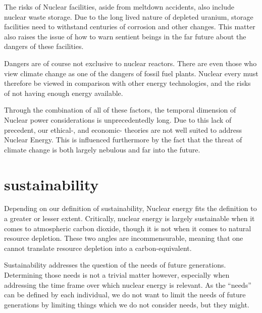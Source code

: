 \documentclass[12pt]{report}
\begin{document}
The risks of Nuclear facilities, aside from meltdown accidents, also include
nuclear waste storage. Due to the long lived nature of depleted uranium, storage
facilities need to withstand centuries of corrosion and other changes. This
matter also raises the issue of how to warn sentient beings in the far future
about the dangers of these facilities.

Dangers are of course not exclusive to nuclear reactors. There are even those
who view climate change as one of the dangers of fossil fuel plants. Nuclear
every must therefore be viewed in comparison with other energy technologies, and
the risks of not having enough energy available.

Through the combination of all of these factors, the temporal dimension of
Nuclear power considerations is unprecedentedly long. Due to this lack of
precedent, our ethical-, and economic- theories are not well suited to address
Nuclear Energy. This is influenced furthermore by the fact that the threat of
climate change is both largely nebulous and far into the future.

\section{sustainability}

Depending on our definition of sustainability, Nuclear energy fits the
definition to a greater or lesser extent. Critically, nuclear energy is largely
sustainable when it comes to atmospheric carbon dioxide, though it is not when
it comes to natural resource depletion. These two angles are incommensurable,
meaning that one cannot translate resource depletion into a carbon-equivalent.

Sustainability addresses the question of the needs of future generations.
Determining those needs is not a trivial matter however, especially when
addressing the time frame over which nuclear energy is relevant. As the
``needs'' can be defined by each individual, we do not want to limit the needs
of future generations by limiting things which we do not consider needs, but
they might.
\end{document}
